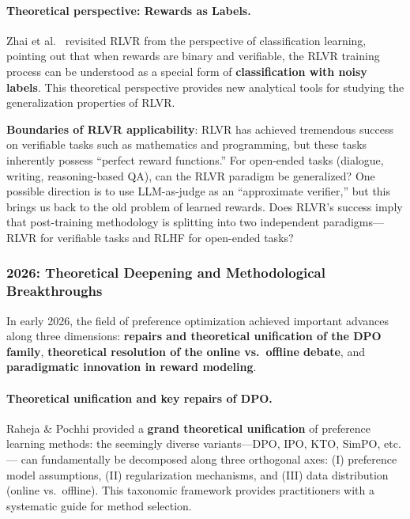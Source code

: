 \paragraph{Theoretical perspective: Rewards as Labels.}
Zhai et al.\ \cite{zhai2026real} revisited RLVR from the perspective of classification learning,
pointing out that when rewards are binary and verifiable,
the RLVR training process can be understood as a special form of \textbf{classification with noisy labels}.
This theoretical perspective provides new analytical tools for studying the generalization properties of RLVR.

\begin{openproblembox}
\textbf{Boundaries of RLVR applicability}:
RLVR has achieved tremendous success on verifiable tasks such as mathematics and programming,
but these tasks inherently possess ``perfect reward functions.''
For open-ended tasks (dialogue, writing, reasoning-based QA),
can the RLVR paradigm be generalized?
One possible direction is to use LLM-as-judge as an ``approximate verifier,''
but this brings us back to the old problem of learned rewards.
Does RLVR's success imply that post-training methodology is splitting into two independent paradigms---
RLVR for verifiable tasks and RLHF for open-ended tasks?
\end{openproblembox}

\subsubsection{2026: Theoretical Deepening and Methodological Breakthroughs}
\label{sec:t2-2026}

In early 2026, the field of preference optimization achieved important advances along three dimensions:
\textbf{repairs and theoretical unification of the DPO family},
\textbf{theoretical resolution of the online vs.\ offline debate},
and \textbf{paradigmatic innovation in reward modeling}.

\paragraph{Theoretical unification and key repairs of DPO.}
Raheja \& Pochhi \cite{raheja2026unification} provided a
\textbf{grand theoretical unification} of preference learning methods:
the seemingly diverse variants---DPO, IPO, KTO, SimPO, etc.---
can fundamentally be decomposed along three orthogonal axes:
(I) preference model assumptions, (II) regularization mechanisms, and (III) data distribution (online vs.\ offline).
This taxonomic framework provides practitioners with a systematic guide for method selection.

